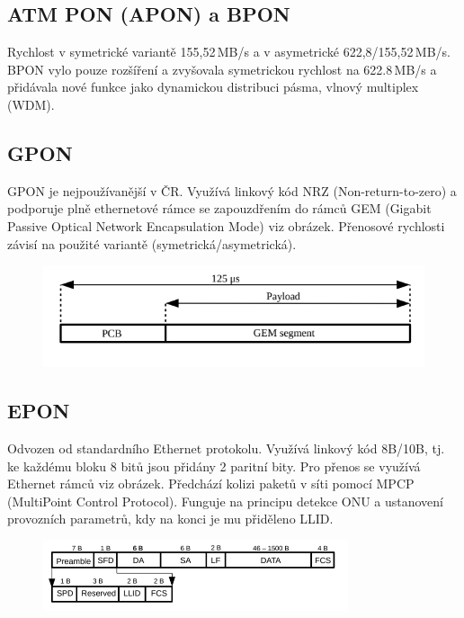 \subsection{ATM PON (APON) a BPON}
Rychlost v symetrické variantě 155,52\,MB/s a v asymetrické 622,8/155,52\,MB/s. BPON vylo pouze rozšíření a zvyšovala symetrickou rychlost na 622.8\,MB/s a přidávala nové funkce jako dynamickou distribuci pásma, vlnový multiplex (WDM).

\subsection{GPON}
GPON je nejpoužívanější v ČR. Využívá linkový kód NRZ (Non-return-to-zero) a podporuje plně ethernetové rámce se zapouzdřením do rámců GEM (Gigabit Passive Optical Network Encapsulation Mode) viz obrázek. Přenosové rychlosti závisí na použité variantě (symetrická/asymetrická).

\begin{figure} [h]
    \centering
    \includegraphics[width=\textwidth]{snimky/gemFrame.png}
\end{figure}

\subsection{EPON}
Odvozen od standardního Ethernet protokolu. Využívá linkový kód 8B/10B, tj. ke každému bloku 8 bitů jsou přidány 2 paritní bity. Pro přenos se využívá Ethernet rámců viz obrázek. Předchází kolizi paketů v síti pomocí MPCP (MultiPoint Control Protocol). Funguje na principu detekce ONU a ustanovení provozních parametrů, kdy na konci je mu přiděleno LLID. 

\begin{figure} [h]
    \centering
    \includegraphics[width=0.8\textwidth]{snimky/EPONframe.png}
\end{figure}

